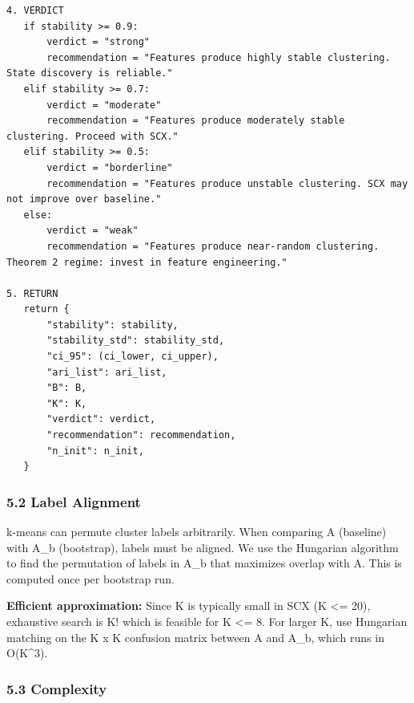 \documentclass[
  12pt,
]{ctexart}
\begin{document}
\begin{verbatim}
4. VERDICT
   if stability >= 0.9:
       verdict = "strong"
       recommendation = "Features produce highly stable clustering. State discovery is reliable."
   elif stability >= 0.7:
       verdict = "moderate"
       recommendation = "Features produce moderately stable clustering. Proceed with SCX."
   elif stability >= 0.5:
       verdict = "borderline"
       recommendation = "Features produce unstable clustering. SCX may not improve over baseline."
   else:
       verdict = "weak"
       recommendation = "Features produce near-random clustering. Theorem 2 regime: invest in feature engineering."

5. RETURN
   return {
       "stability": stability,
       "stability_std": stability_std,
       "ci_95": (ci_lower, ci_upper),
       "ari_list": ari_list,
       "B": B,
       "K": K,
       "verdict": verdict,
       "recommendation": recommendation,
       "n_init": n_init,
   }
\end{verbatim}

\subsubsection{5.2 Label Alignment}\label{label-alignment}

k-means can permute cluster labels arbitrarily. When comparing A
(baseline) with A\_b (bootstrap), labels must be aligned. We use the
Hungarian algorithm to find the permutation of labels in A\_b that
maximizes overlap with A. This is computed once per bootstrap run.

\textbf{Efficient approximation:} Since K is typically small in SCX (K
\textless= 20), exhaustive search is K! which is feasible for K
\textless= 8. For larger K, use Hungarian matching on the K x K
confusion matrix between A and A\_b, which runs in O(K\^{}3).

\subsubsection{5.3 Complexity}\label{complexity}
\end{document}
